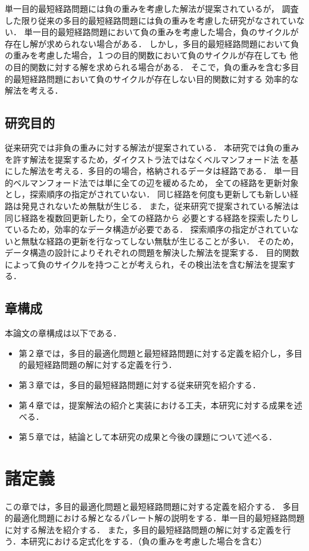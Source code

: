 \documentclass[12pt]{optlab-bachelor}
\begin{document}
単一目的最短経路問題には負の重みを考慮した解法が提案されているが，
調査した限り従来の多目的最短経路問題には負の重みを考慮した研究がなされていない．
単一目的最短経路問題において負の重みを考慮した場合，負のサイクルが存在し解が求められない場合がある．
しかし，多目的最短経路問題において負の重みを考慮した場合，１つの目的関数において負のサイクルが存在しても
他の目的関数に対する解を求められる場合がある．
そこで，負の重みを含む多目的最短経路問題において負のサイクルが存在しない目的関数に対する
効率的な解法を考える．

\section{研究目的}
従来研究では非負の重みに対する解法が提案されている．
本研究では負の重みを許す解法を提案するため，ダイクストラ法ではなくベルマンフォード法
を基にした解法を考える．多目的の場合，格納されるデータは経路である．
単一目的ベルマンフォード法では単に全ての辺を緩めるため，
全ての経路を更新対象とし，探索順序の指定がされていない．
同じ経路を何度も更新しても新しい経路は発見されないため無駄が生じる．
また，従来研究で提案されている解法は同じ経路を複数回更新したり，全ての経路から
必要とする経路を探索したりしているため，効率的なデータ構造が必要である．
探索順序の指定がされていないと無駄な経路の更新を行なってしない無駄が生じることが多い．
そのため，データ構造の設計によりそれぞれの問題を解決した解法を提案する．
目的関数によって負のサイクルを持つことが考えられ，その検出法を含む解法を提案する．

\section{章構成}

  本論文の章構成は以下である．
  \begin{itemize}
  \item 第２章では，多目的最適化問題と最短経路問題に対する定義を紹介し，多目的最短経路問題の解に対する定義を行う．
  \item 第３章では，多目的最短経路問題に対する従来研究を紹介する．
  \item 第４章では，提案解法の紹介と実装における工夫，本研究に対する成果を述べる．
  \item 第５章では，結論として本研究の成果と今後の課題について述べる．
\end{itemize}

\chapter{諸定義}
この章では，多目的最適化問題と最短経路問題に対する定義を紹介する．
多目的最適化問題における解となるパレート解の説明をする．単一目的最短経路問題に対する解法を紹介する．
また，多目的最短経路問題の解に対する定義を行う．本研究における定式化をする．（負の重みを考慮した場合を含む）
\end{document}
